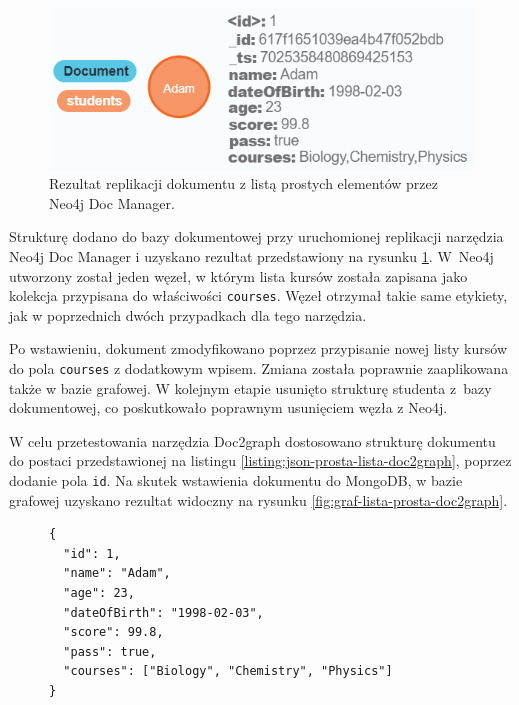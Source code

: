 \documentclass[a4paper,twoside,12pt]{book}
\begin{document}
\begin{figure}[bp!]
\centering
\includegraphics[width=12cm]{images/lista_prosta_neo4jdocmanager.png}
\caption{Rezultat replikacji dokumentu z listą prostych elementów przez Neo4j Doc Manager.}
\label{fig:graf-lista-prosta-neo4jdocmanager}
\end{figure}

Strukturę dodano do bazy dokumentowej przy uruchomionej replikacji narzędzia Neo4j Doc Manager i uzyskano rezultat przedstawiony na rysunku \ref{fig:graf-lista-prosta-neo4jdocmanager}. W~Neo4j utworzony został jeden węzeł, w którym lista kursów została zapisana jako kolekcja przypisana do właściwości \texttt{courses}. Węzeł otrzymał takie same etykiety, jak w poprzednich dwóch przypadkach dla tego narzędzia.

Po wstawieniu, dokument zmodyfikowano poprzez przypisanie nowej listy kursów do pola \texttt{courses} z dodatkowym wpisem. Zmiana została poprawnie zaaplikowana także w bazie grafowej. W kolejnym etapie usunięto strukturę studenta z~bazy dokumentowej, co poskutkowało poprawnym usunięciem węzła z Neo4j.   

W celu przetestowania narzędzia Doc2graph dostosowano strukturę dokumentu do postaci przedstawionej na listingu \ref{listing:json-prosta-lista-doc2graph}, poprzez dodanie pola \texttt{id}. Na skutek wstawienia dokumentu do MongoDB, w bazie grafowej uzyskano rezultat widoczny na rysunku \ref{fig:graf-lista-prosta-doc2graph}. 

\begin{figure}[h]
\begin{lstlisting}[style=JSON, caption={Struktura dokumentu z listą prostych elementów dla Doc2graph.}, label={listing:json-prosta-lista-doc2graph}, captionpos=b]
{
  "id": 1,
  "name": "Adam",
  "age": 23,
  "dateOfBirth": "1998-02-03",
  "score": 99.8,	
  "pass": true,
  "courses": ["Biology", "Chemistry", "Physics"]
}
\end{lstlisting}
\end{figure}
\end{document}
